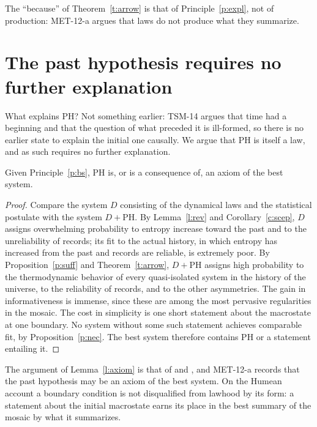 \documentclass{situationist-preprint}
\begin{document}
The \enquote{because} of Theorem~\ref{t:arrow} is that of Principle~\ref{p:expl}, not of production: MET-12-a argues that laws do not produce what they summarize.

\section{The past hypothesis requires no further explanation}\label{s:noexpl}

What explains PH? Not something earlier: TSM-14 argues that time had a beginning and that the question of what preceded it is ill-formed, so there is no earlier state to explain the initial one causally. We argue that PH is itself a law, and as such requires no further explanation.

\begin{lemma}\label{l:axiom}
Given Principle~\ref{p:bs}, PH is, or is a consequence of, an axiom of the best system.
\end{lemma}

\begin{proof}
Compare the system $D$ consisting of the dynamical laws and the statistical postulate with the system $D+\mathrm{PH}$. By Lemma~\ref{l:rev} and Corollary~\ref{c:scep}, $D$ assigns overwhelming probability to entropy increase toward the past and to the unreliability of records; its fit to the actual history, in which entropy has increased from the past and records are reliable, is extremely poor. By Proposition~\ref{p:suff} and Theorem~\ref{t:arrow}, $D+\mathrm{PH}$ assigns high probability to the thermodynamic behavior of every quasi-isolated system in the history of the universe, to the reliability of records, and to the other asymmetries. The gain in informativeness is immense, since these are among the most pervasive regularities in the mosaic. The cost in simplicity is one short statement about the macrostate at one boundary. No system without some such statement achieves comparable fit, by Proposition~\ref{p:nec}. The best system therefore contains PH or a statement entailing it.
\end{proof}

The argument of Lemma~\ref{l:axiom} is that of \citet{Albert2000} and \citet{Loewer2012}, and MET-12-a records that the past hypothesis may be an axiom of the best system. On the Humean account a boundary condition is not disqualified from lawhood by its form: a statement about the initial macrostate earns its place in the best summary of the mosaic by what it summarizes.
\end{document}
